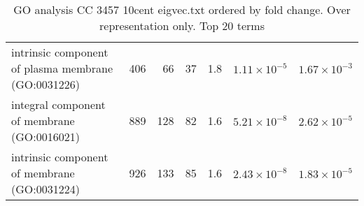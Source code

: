 \begin{table}[ht]
\begin{adjustbox}{width=\textwidth}
\begin{tabular}{lrrrrrr}
  intrinsic component of plasma membrane (GO:0031226) & 406 & 66 & 37 & 1.8 & $1.11 \times 10^{-5}$ & $1.67 \times 10^{-3}$ \\ 
  integral component of membrane (GO:0016021) & 889 & 128 & 82 & 1.6 & $5.21 \times 10^{-8}$ & $2.62 \times 10^{-5}$ \\ 
  intrinsic component of membrane (GO:0031224) & 926 & 133 & 85 & 1.6 & $2.43 \times 10^{-8}$ & $1.83 \times 10^{-5}$ \\ 
   \hline
\end{tabular}
\end{adjustbox}
\caption{GO analysis CC 3457 10cent eigvec.txt ordered by fold change. Over representation only. Top 20 terms} 
\label{tab:GO analysis CC 3457 10cent eigvec.txt ordered by fold change. Over representation only. Top 20 terms}
\end{table}


